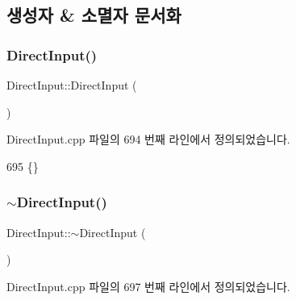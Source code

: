 \subsection{생성자 \& 소멸자 문서화}
\mbox{\label{class_direct_input_a63ec945b71a6119e7e3d5d7195a9050f}} 
\subsubsection{\texorpdfstring{Direct\+Input()}{DirectInput()}}
{\footnotesize\ttfamily Direct\+Input\+::\+Direct\+Input (\begin{DoxyParamCaption}{ }\end{DoxyParamCaption})}



Direct\+Input.\+cpp 파일의 694 번째 라인에서 정의되었습니다.


\begin{DoxyCode}
695 \{\}
\end{DoxyCode}
\mbox{\label{class_direct_input_a9ad919625264b7115fdf20f77c9d2534}} 
\subsubsection{\texorpdfstring{$\sim$\+Direct\+Input()}{~DirectInput()}}
{\footnotesize\ttfamily Direct\+Input\+::$\sim$\+Direct\+Input (\begin{DoxyParamCaption}{ }\end{DoxyParamCaption})\hspace{0.3cm}{\ttfamily [virtual]}}



Direct\+Input.\+cpp 파일의 697 번째 라인에서 정의되었습니다.


